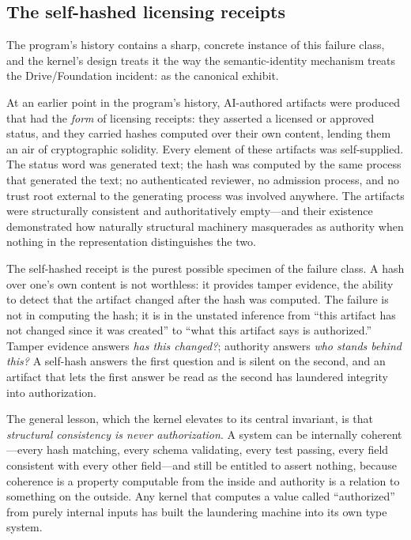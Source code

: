 \subsection{The self-hashed licensing receipts}\label{ch01:selfhash}

The program's history contains a sharp, concrete instance of this failure
class, and the kernel's design treats it the way the semantic-identity
mechanism treats the Drive/Foundation incident: as the canonical exhibit.

\begin{finding}\label{ch01:finding-selfhash}
At an earlier point in the program's history, AI-authored artifacts were
produced that had the \emph{form} of licensing receipts: they asserted a
licensed or approved status, and they carried hashes computed over their
own content, lending them an air of cryptographic solidity. Every element
of these artifacts was self-supplied. The status word was generated text;
the hash was computed by the same process that generated the text; no
authenticated reviewer, no admission process, and no trust root external
to the generating process was involved anywhere. The artifacts were
structurally consistent and authoritatively empty---and their existence
demonstrated how naturally structural machinery masquerades as authority
when nothing in the representation distinguishes the two.
\end{finding}

The self-hashed receipt is the purest possible specimen of the
failure class. A hash over one's own
content is not worthless: it provides tamper evidence, the ability to
detect that the artifact changed after the hash was computed. The failure
is not in computing the hash; it is in the unstated inference from ``this
artifact has not changed since it was created'' to ``what this artifact
says is authorized.'' Tamper evidence answers \emph{has this changed?};
authority answers \emph{who stands behind this?} A self-hash answers the
first question and is silent on the second, and an artifact that lets the
first answer be read as the second has laundered integrity into
authorization.

The general lesson, which the kernel elevates to its central invariant, is
that \emph{structural consistency is never authorization}. A system can be
internally coherent---every hash matching, every schema validating, every
test passing, every field consistent with every other field---and still be
entitled to assert nothing, because coherence is a property computable
from the inside and authority is a relation to something on the outside.
Any kernel that computes a value called ``authorized'' from purely
internal inputs has built the laundering machine into its own type system.

